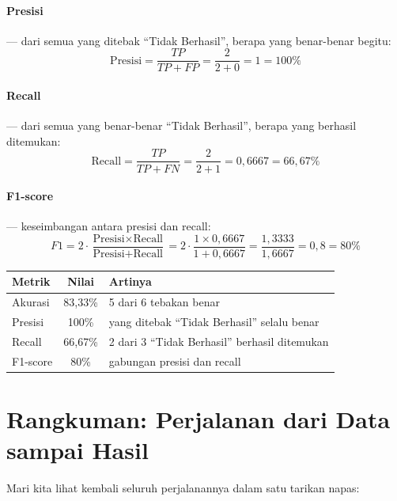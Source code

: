 \documentclass[11pt,a4paper]{article}
\begin{document}
\paragraph{Presisi} --- dari semua yang ditebak ``Tidak Berhasil'', berapa yang benar-benar begitu:
\[ \text{Presisi} = \frac{TP}{TP + FP} = \frac{2}{2+0} = 1 = 100\% \]

\paragraph{Recall} --- dari semua yang benar-benar ``Tidak Berhasil'', berapa yang berhasil ditemukan:
\[ \text{Recall} = \frac{TP}{TP + FN} = \frac{2}{2+1} = 0{,}6667 = 66{,}67\% \]

\paragraph{F1-score} --- keseimbangan antara presisi dan recall:
\[
F1 = 2 \cdot \frac{\text{Presisi} \times \text{Recall}}{\text{Presisi} + \text{Recall}}
   = 2 \cdot \frac{1 \times 0{,}6667}{1 + 0{,}6667}
   = \frac{1{,}3333}{1{,}6667} = 0{,}8 = 80\%
\]

\begin{hasil}
\begin{center}
\begin{tabular}{lcl}
\toprule
\textbf{Metrik} & \textbf{Nilai} & \textbf{Artinya} \\
\midrule
Akurasi  & 83{,}33\% & 5 dari 6 tebakan benar \\
Presisi  & 100\%     & yang ditebak ``Tidak Berhasil'' selalu benar \\
Recall   & 66{,}67\% & 2 dari 3 ``Tidak Berhasil'' berhasil ditemukan \\
F1-score & 80\%      & gabungan presisi dan recall \\
\bottomrule
\end{tabular}
\end{center}
\end{hasil}

\section{Rangkuman: Perjalanan dari Data sampai Hasil}

Mari kita lihat kembali seluruh perjalanannya dalam satu tarikan napas:
\end{document}
